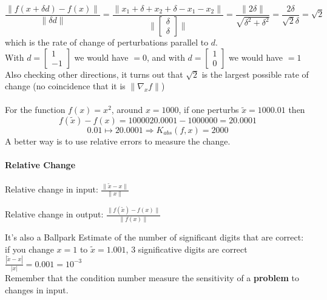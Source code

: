 \documentclass[10pt]{report}
\begin{document}
$$\frac{\|f(x+\delta d) - f(x)\|}{\|\delta d\|} = \frac{\|x_1+\delta+x_2+\delta-x_1-x_2\|}{\| \left[\begin{array}{c}
\delta\\\delta
\end{array}\right]\|} = \frac{\|2\delta\|}{\sqrt{\delta^2 + \delta^2}} = \frac{2\delta}{\sqrt{2}\delta} = \sqrt{2}$$ which is the rate of change of perturbations parallel to $d$.\\
With $d = \left[\begin{array}{c}
1\\-1
\end{array}\right]$ we would have $= 0$, and with $d = \left[\begin{array}{c}
1\\0
\end{array}\right]$ we would have $= 1$\\
Also checking other directions, it turns out that $\sqrt{2}$ is the largest possible rate of change (no coincidence that it is $\|\nabla_x f\|$)\\\\
For the function $f(x) = x^2$, around $x=1000$, if one perturbs $\tilde{x}=1000.01$ then $$f(\tilde{x})-f(x) = 1000020.0001-1000000 = 20.0001$$ $$0.01\mapsto 20.0001 \Rightarrow K_{abs}(f,x) = 2000$$
A better way is to use relative errors to measure the change.
\paragraph{Relative Change}\begin{list}{}{}
	\item Relative change in input: $\frac{\|\tilde{x}-x\|}{\|x\|}$
	\item Relative change in output: $\frac{\|f(\tilde{x})-f(x)\|}{\|f(x)\|}$
\end{list}
It's also a Ballpark Estimate of the number of significant digits that are correct: if you change $x=1$ to $\tilde{x}=1.001$, $3$ significative digits are correct $\frac{|\tilde{x}-x|}{|x|}=0.001 = 10^{-3}$\\
Remember that the condition number measure the sensitivity of a \textbf{problem} to changes in input.
\end{document}
